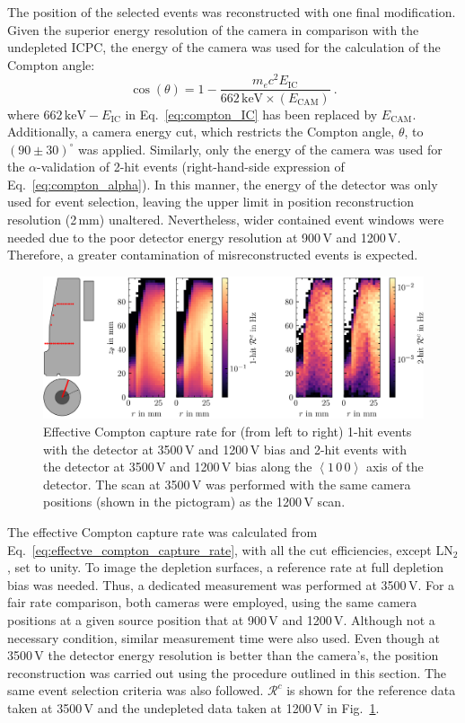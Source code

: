 The position of the selected events was reconstructed with one final modification. Given the superior energy resolution of the camera in comparison with the undepleted ICPC, the energy of the camera was used for the calculation of the Compton angle:
\begin{equation} \label{eq:compton_CAM}
    \cos(\theta) = 1 - \dfrac{m_ec^2 E_\text{IC}}{662\,\text{keV} \times \left(E_\text{CAM}\right)}~.
\end{equation}
where $662\,\text{keV} - E_\text{IC}$ in Eq.~\ref{eq:compton_IC} has been replaced by $E_\text{CAM}$. Additionally, a camera energy cut, which restricts the Compton angle, $\theta$, to $(90\pm30)^\circ$ was applied. Similarly, only the energy of the camera was used for the $\alpha$-validation of 2-hit events (right-hand-side expression of Eq.~\ref{eq:compton_alpha}). In this manner, the energy of the detector was only used for event selection, leaving the upper limit in position reconstruction resolution (2\,mm) unaltered. Nevertheless, wider contained event windows were needed due to the poor detector energy resolution at 900\,V and 1200\,V. Therefore, a greater contamination of misreconstructed events is expected.
\begin{figure}[htb]
    \centering
    \includegraphics[width=6in]{figs/bubbles/bubble_rates.png}
    \caption{Effective Compton capture rate for (from left to right) 1-hit events with the detector at 3500\,V and 1200\,V bias and 2-hit events with the detector at 3500\,V and 1200\,V bias along the $\left<1\,0\,0\right>$ axis of the detector. The scan at 3500\,V was performed with the same camera positions (shown in the pictogram) as the 1200\,V scan.}
	\label{fig:bubble_rates}
\end{figure}

The effective Compton capture rate was calculated from Eq.~\ref{eq:effectve_compton_capture_rate}, with all the cut efficiencies, except LN$_2$, set to unity. To image the depletion surfaces, a reference rate at full depletion bias was needed. Thus, a dedicated measurement was performed at 3500\,V. For a fair rate comparison, both cameras were employed, using the same camera positions at a given \CsS{} source position that at 900\,V and 1200\,V. Although not a necessary condition, similar measurement time were also used. Even though at 3500\,V the detector energy resolution is better than the camera's, the position reconstruction was carried out using the procedure outlined in this section. The same event selection criteria was also followed. $\mathcal{R}^c$ is shown for the reference data taken at 3500\,V and the undepleted data taken at 1200\,V in Fig.~\ref{fig:bubble_rates}. 

